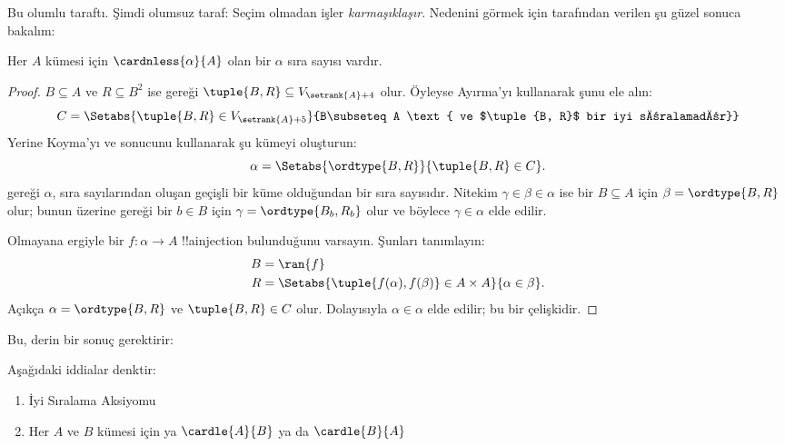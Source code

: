\documentclass[../../../include/open-logic-section]{subfiles}
\begin{document}

Bu olumlu taraftı. Şimdi olumsuz taraf: Seçim olmadan işler
\emph{karmaşıklaşır}. Nedenini görmek için \cite{Hartogs1915} tarafından
verilen şu güzel sonuca bakalım:

\begin{lem}
Her $A$ kümesi için $\cardnless{\alpha}{A}$ olan bir $\alpha$ sıra sayısı
vardır.
\end{lem}

\begin{proof}
$B\subseteq A$ ve $R\subseteq B^2$ ise
 gereği
$\tuple{B,R}\subseteq V_{\setrank{A}+4}$ olur. Öyleyse Ayırma'yı kullanarak
şunu ele alın:
\[
	C = \Setabs{\tuple{B, R} \in V_{\setrank{A}+5}}{B\subseteq A
	\text{ ve $\tuple{B, R}$ bir iyi sıralamadır}}
\]
Yerine Koyma'yı ve
 sonucunu kullanarak
şu kümeyi oluşturun:
\[
	\alpha = \Setabs{\ordtype{B, R}}{\tuple{B, R} \in C}.
\]
 gereği $\alpha$, sıra
sayılarından oluşan geçişli bir küme olduğundan bir sıra sayısıdır.
Nitekim $\gamma\in\beta\in\alpha$ ise bir $B\subseteq A$ için
$\beta=\ordtype{B,R}$ olur; bunun üzerine
 gereği bir $b\in B$ için
$\gamma=\ordtype{B_b,R_b}$ olur ve böylece $\gamma\in\alpha$ elde edilir.

Olmayana ergiyle bir $f\colon\alpha\to A$ !!a{injection} bulunduğunu
varsayın. Şunları tanımlayın:
\begin{align*}
	B &= \ran{f}\\
	R &= \Setabs{\tuple{f(\alpha), f(\beta)} \in A \times A}{\alpha \in \beta}.
\end{align*}
Açıkça $\alpha=\ordtype{B,R}$ ve $\tuple{B,R}\in C$ olur. Dolayısıyla
$\alpha\in\alpha$ elde edilir; bu bir çelişkidir.
\end{proof}

Bu, derin bir sonuç gerektirir:

\begin{thm}
Aşağıdaki iddialar denktir:
\begin{enumerate}
	\item{} İyi Sıralama Aksiyomu
	\item{} Her $A$ ve $B$ kümesi için ya
	$\cardle{A}{B}$ ya da $\cardle{B}{A}$
\end{enumerate}
\end{thm}
\end{document}
